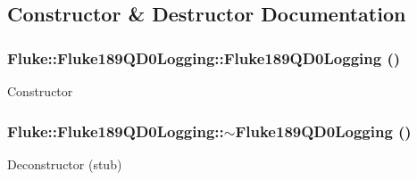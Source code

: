 \subsection{Constructor \& Destructor Documentation}
\hypertarget{classFluke_1_1Fluke189QD0Logging_ab856daf79c71ace0841c10c9f9b8f9e6}{
\subsubsection[{Fluke189QD0Logging}]{\setlength{\rightskip}{0pt plus 5cm}Fluke::Fluke189QD0Logging::Fluke189QD0Logging ()}}
\label{classFluke_1_1Fluke189QD0Logging_ab856daf79c71ace0841c10c9f9b8f9e6}
Constructor \hypertarget{classFluke_1_1Fluke189QD0Logging_ac134feed3bec91193ba7ffd119f9833d}{
\subsubsection[{$\sim$Fluke189QD0Logging}]{\setlength{\rightskip}{0pt plus 5cm}Fluke::Fluke189QD0Logging::$\sim$Fluke189QD0Logging ()}}
\label{classFluke_1_1Fluke189QD0Logging_ac134feed3bec91193ba7ffd119f9833d}
Deconstructor (stub) 

